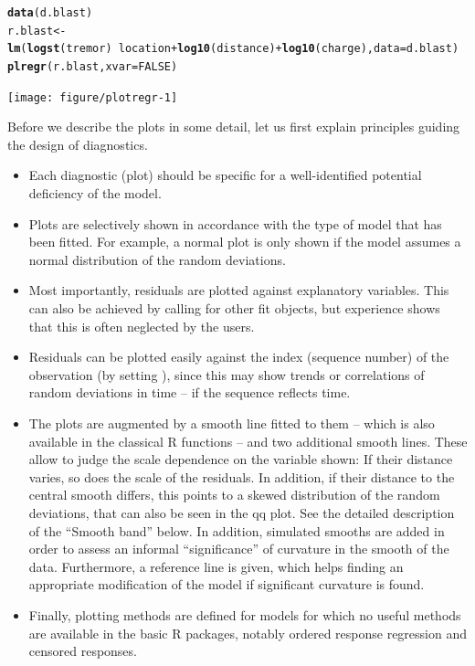 \documentclass[11pt]{article}\usepackage[]{graphicx}\usepackage[]{color}
\makeatletter
\newcommand{\hlnum}[1]{\textcolor[rgb]{0.686,0.059,0.569}{#1}}%
\newcommand{\hlopt}[1]{\textcolor[rgb]{0,0,0}{#1}}%
\newcommand{\hlstd}[1]{\textcolor[rgb]{0.345,0.345,0.345}{#1}}%
\newcommand{\hlkwb}[1]{\textcolor[rgb]{0.69,0.353,0.396}{#1}}%
\newcommand{\hlkwc}[1]{\textcolor[rgb]{0.333,0.667,0.333}{#1}}%
\newcommand{\hlkwd}[1]{\textcolor[rgb]{0.737,0.353,0.396}{\textbf{#1}}}%
\newenvironment{kframe}{%
 \def\at@end@of@kframe{}%
 \ifinner\ifhmode%
  \def\at@end@of@kframe{\end{minipage}}%
  \begin{minipage}{\columnwidth}%
 \fi\fi%
 \def\FrameCommand##1{\hskip\@totalleftmargin \hskip-\fboxsep
 \colorbox{shadecolor}{##1}\hskip-\fboxsep
     \hskip-\linewidth \hskip-\@totalleftmargin \hskip\columnwidth}%
 \MakeFramed {\advance\hsize-\width
   \@totalleftmargin\z@ \linewidth\hsize
   \@setminipage}}%
 {\par\unskip\endMakeFramed%
 \at@end@of@kframe}
\newenvironment{knitrout}{}{} %
\makeatother
\begin{document}
\begin{knitrout}
\color{fgcolor}\begin{kframe}
\begin{alltt}
\hlkwd{data}\hlstd{(d.blast)}
\hlstd{r.blast} \hlkwb{<-}
  \hlkwd{lm}\hlstd{(}\hlkwd{logst}\hlstd{(tremor)}\hlopt{~}\hlstd{location}\hlopt{+}\hlkwd{log10}\hlstd{(distance)}\hlopt{+}\hlkwd{log10}\hlstd{(charge),} \hlkwc{data}\hlstd{=d.blast)}
\hlkwd{plregr}\hlstd{(r.blast,} \hlkwc{xvar}\hlstd{=}\hlnum{FALSE}\hlstd{)}
\end{alltt}
\end{kframe}
\texttt{[image: figure/plotregr-1]} 

\end{knitrout}
Before we describe the plots in some detail, let us first explain  
principles guiding the design of diagnostics.
\begin{itemize}
\item
Each diagnostic (plot) should be specific for a well-identified potential 
deficiency of the model.
\item
Plots are selectively shown in accordance with the type of model that has 
been fitted. For example, a normal plot is only shown if the model assumes
a normal distribution of the random deviations.
\item
Most importantly, residuals are plotted against explanatory variables.
This can also be achieved by calling  for other fit objects,  
but experience shows that this is often neglected by the users.
\item
Residuals can be plotted easily against the index (sequence number) 
of the observation (by setting ), 
since this may show trends or correlations of random deviations in time --
if the sequence reflects time.
\item
The plots are augmented by a smooth line fitted to them -- which is also
available in the classical R functions -- and two additional smooth lines.
These allow to judge the scale dependence on the variable shown:
If their distance varies, so does the scale of the residuals.
In addition, if their distance to the central smooth differs, this 
points to a skewed distribution of the random deviations, 
that can also be seen in the qq plot. See the detailed description 
of the ``Smooth band'' below. 
In addition, simulated smooths are added in order to assess an informal 
``significance'' of curvature in the smooth of the data. 
Furthermore, a reference line is given, which helps finding
an appropriate modification of the model if significant curvature is
found. 
\item
Finally, plotting methods are defined for models for which no useful 
methods are available in the basic R packages, notably ordered response
regression and censored responses.
\end{itemize}
\end{document}
